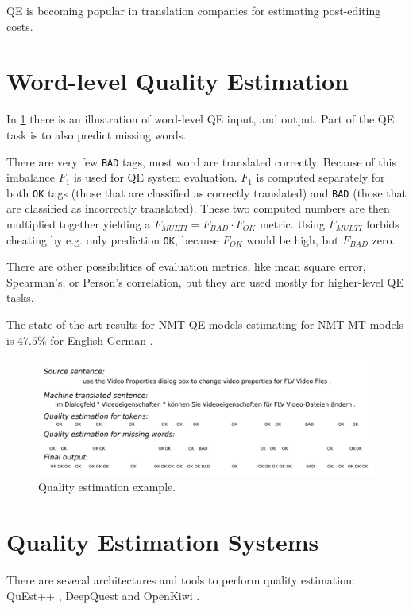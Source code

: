 \documentclass[12pt]{article}
\begin{document}
QE is becoming popular in translation companies for estimating post-editing costs.

\section{Word-level Quality Estimation}

In \cref{fig:example_qe_annotation} there is an illustration of word-level QE input, and output. Part of the QE task is to also predict missing words.

There are very few \texttt{BAD} tags, most word are translated correctly. Because of this imbalance $F_1$ is used for QE system evaluation. $F_1$ is computed separately for both \texttt{OK} tags (those that are classified as correctly translated) and \texttt{BAD} (those that are classified as incorrectly translated). These two computed numbers are then multiplied together yielding a $F_{MULTI} = F_{BAD} \cdot F_{OK}$ metric. Using $F_{MULTI}$ forbids cheating by e.g. only prediction \texttt{OK}, because $F_{OK}$ would be high, but $F_{BAD}$ zero. 

There are other possibilities of evaluation metrics, like mean square error, Spearman's, or Person's correlation, but they are used mostly for higher-level QE tasks.

The state of the art results for NMT QE models estimating for NMT MT models is $47.5\%$ for English-German \cite{fonseca2019findings}.

\begin{figure}[ht]
  \centering
  \includegraphics[width=\textwidth]{img/example_qe_annotation.png}
  \caption{Quality estimation example.}
  \label{fig:example_qe_annotation}
\end{figure}

\section{Quality Estimation Systems}

There are several architectures and tools to perform quality estimation: QuEst++ \cite{questplusplus}, DeepQuest \cite{deepquest} and OpenKiwi \cite{openkiwi}.
\end{document}
